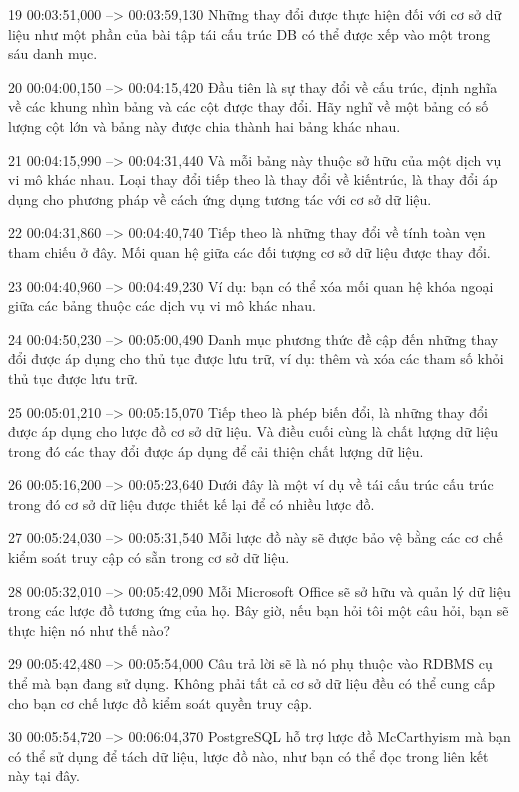 19
00:03:51,000 --> 00:03:59,130
Những thay đổi được thực hiện đối với cơ sở dữ liệu như một phần của bài tập tái cấu trúc DB có thể được xếp vào một trong sáu danh mục.

20
00:04:00,150 --> 00:04:15,420
Đầu tiên là sự thay đổi về cấu trúc, định nghĩa về các khung nhìn bảng và các cột được thay đổi.  Hãy nghĩ về một bảng có số lượng cột lớn và bảng này được chia thành hai bảng khác nhau.

21
00:04:15,990 --> 00:04:31,440
Và mỗi bảng này thuộc sở hữu của một dịch vụ vi mô khác nhau.  Loại thay đổi tiếp theo là thay đổi về kiến ​​trúc, là thay đổi áp dụng cho phương pháp về cách ứng dụng tương tác với cơ sở dữ liệu.

22
00:04:31,860 --> 00:04:40,740
Tiếp theo là những thay đổi về tính toàn vẹn tham chiếu ở đây.  Mối quan hệ giữa các đối tượng cơ sở dữ liệu được thay đổi.

23
00:04:40,960 --> 00:04:49,230
Ví dụ: bạn có thể xóa mối quan hệ khóa ngoại giữa các bảng thuộc các dịch vụ vi mô khác nhau.

24
00:04:50,230 --> 00:05:00,490
Danh mục phương thức đề cập đến những thay đổi được áp dụng cho thủ tục được lưu trữ, ví dụ: thêm và xóa các tham số khỏi thủ tục được lưu trữ.

25
00:05:01,210 --> 00:05:15,070
Tiếp theo là phép biến đổi, là những thay đổi được áp dụng cho lược đồ cơ sở dữ liệu.  Và điều cuối cùng là chất lượng dữ liệu trong đó các thay đổi được áp dụng để cải thiện chất lượng dữ liệu.

26
00:05:16,200 --> 00:05:23,640
Dưới đây là một ví dụ về tái cấu trúc cấu trúc trong đó cơ sở dữ liệu được thiết kế lại để có nhiều lược đồ.

27
00:05:24,030 --> 00:05:31,540
Mỗi lược đồ này sẽ được bảo vệ bằng các cơ chế kiểm soát truy cập có sẵn trong cơ sở dữ liệu.

28
00:05:32,010 --> 00:05:42,090
Mỗi Microsoft Office sẽ sở hữu và quản lý dữ liệu trong các lược đồ tương ứng của họ.  Bây giờ, nếu bạn hỏi tôi một câu hỏi, bạn sẽ thực hiện nó như thế nào?

29
00:05:42,480 --> 00:05:54,000
Câu trả lời sẽ là nó phụ thuộc vào RDBMS cụ thể mà bạn đang sử dụng.  Không phải tất cả cơ sở dữ liệu đều có thể cung cấp cho bạn cơ chế lược đồ kiểm soát quyền truy cập.

30
00:05:54,720 --> 00:06:04,370
PostgreSQL hỗ trợ lược đồ McCarthyism mà bạn có thể sử dụng để tách dữ liệu, lược đồ nào, như bạn có thể đọc trong liên kết này tại đây.

